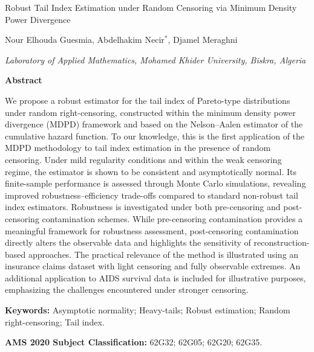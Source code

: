 \documentclass[reqno,openbib,runningheads,a4paper,12pt]{amsart}%
\begin{document}
\begin{center}
{\Large Robust Tail Index Estimation under Random Censoring via Minimum
Density Power Divergence}\bigskip

{\large Nour Elhouda Guesmia, Abdelhakim Necir}$^{\ast}${\large , Djamel
Meraghni}\medskip\newline

{\small \textit{Laboratory of Applied Mathematics, Mohamed Khider University,
Biskra, Algeria}}\medskip\medskip
\end{center}

\noindent\textbf{Abstract}\smallskip

\noindent We propose a robust estimator for the tail index of Pareto-type
distributions under random right-censoring, constructed within the minimum
density power divergence (MDPD) framework and based on the Nelson--Aalen
estimator of the cumulative hazard function. To our knowledge, this is the
first application of the MDPD methodology to tail index estimation in the
presence of random censoring. Under mild regularity conditions and within the
weak censoring regime, the estimator is shown to be consistent and
asymptotically normal. Its finite-sample performance is assessed through Monte
Carlo simulations, revealing improved robustness--efficiency trade-offs
compared to standard non-robust tail index estimators. Robustness is
investigated under both pre-censoring and post-censoring contamination
schemes. While pre-censoring contamination provides a meaningful framework for
robustness assessment, post-censoring contamination directly alters the
observable data and highlights the sensitivity of reconstruction-based
approaches. The practical relevance of the method is illustrated using an
insurance claims dataset with light censoring and fully observable extremes.
An additional application to AIDS survival data is included for illustrative
purposes, emphasizing the challenges encountered under stronger
censoring.\medskip

\noindent\textbf{Keywords:} Asymptotic normality; Heavy-tails; Robust
estimation; Random right-censoring; Tail index.\medskip

\noindent\textbf{AMS 2020 Subject Classification:} 62G32; 62G05; 62G20; 62G35.

\vfill


\vfill


\newline
\end{document}
